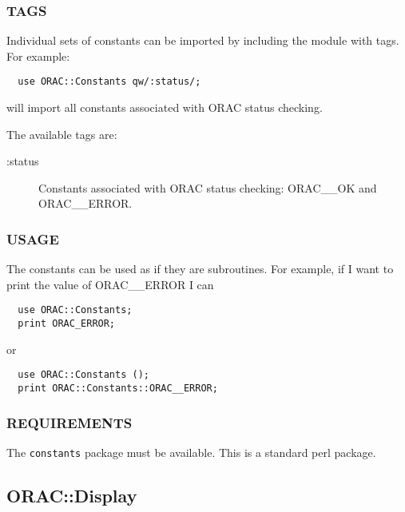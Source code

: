 \subsubsection*{TAGS\label{ORAC::Constants_TAGS}}

Individual sets of constants can be imported by 
including the module with tags. For example:

\begin{verbatim}
  use ORAC::Constants qw/:status/;
\end{verbatim}


will import all constants associated with ORAC status checking.



The available tags are:

\begin{description}
\item[:status] \mbox{}

Constants associated with ORAC status checking: ORAC\_\_OK and ORAC\_\_ERROR.

\end{description}
\subsubsection*{USAGE\label{ORAC::Constants_USAGE}}

The constants can be used as if they are subroutines.
For example, if I want to print the value of ORAC\_\_ERROR I can

\begin{verbatim}
  use ORAC::Constants;
  print ORAC_ERROR;
\end{verbatim}


or

\begin{verbatim}
  use ORAC::Constants ();
  print ORAC::Constants::ORAC__ERROR;
\end{verbatim}

\subsubsection*{REQUIREMENTS\label{ORAC::Constants_REQUIREMENTS}}

The \texttt{constants} package must be available. This is a standard
perl package.



\subsection{ORAC::Display\label{ORAC::Display}}

